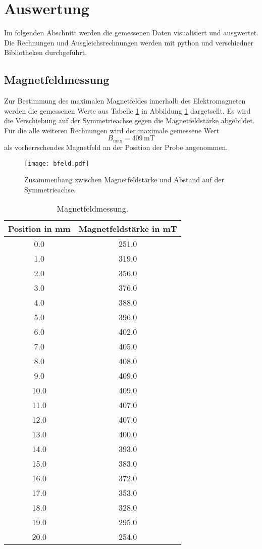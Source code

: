 \section{Auswertung}
\label{sec:Auswertung}

Im folgenden Abschnitt werden die gemessenen Daten visualisiert und ausgwertet.
Die Rechnungen und Ausgleichsrechnungen werden mit python und verschiedner Bibliotheken durchgeführt.

\subsection{Magnetfeldmessung}
\label{sec:magFeld}

Zur Bestimmung des maximalen Magnetfeldes innerhalb des Elektromagneten werden die gemessenen Werte aus Tabelle \ref{tab:magFeld} in Abbildung \ref{abb:magFeld} dargetsellt.
Es wird die Verschiebung auf der Symmetrieachse gegen die Magnetfeldstärke abgebildet.
Für die alle weiteren Rechnungen wird der maximale gemessene Wert
\begin{equation}
  B_{\text{max}}=409\,\text{mT}
\end{equation}
als vorherrschendes Magnetfeld an der Position der Probe angenommen.
\begin{figure}
  \centering
  \texttt{[image: bfeld.pdf]}
  \caption{Zusammenhang zwischen Magnetfeldstärke und Abstand auf der Symmetrieachse.}
  \label{abb:magFeld}
\end{figure}
\FloatBarrier

\begin{table}
  \centering
  \caption{Magnetfeldmessung.}
  \label{tab:magFeld}
  \begin{tabular}{c | c}
    \toprule
    Position in mm & Magnetfeldstärke in mT \\
    \midrule
    0.0 & 251.0 \\
    1.0 & 319.0 \\
    2.0 & 356.0 \\
    3.0 & 376.0 \\
    4.0 & 388.0 \\
    5.0 & 396.0 \\
    6.0 & 402.0 \\
    7.0 & 405.0 \\
    8.0 & 408.0 \\
    9.0 & 409.0 \\
    10.0 & 409.0 \\
    11.0 & 407.0 \\
    12.0 & 407.0 \\
    13.0 & 400.0 \\
    14.0 & 393.0 \\
    15.0 & 383.0 \\
    16.0 & 372.0 \\
    17.0 & 353.0 \\
    18.0 & 328.0 \\
    19.0 & 295.0 \\
    20.0 & 254.0 \\
    \bottomrule
  \end{tabular}
\end{table}
\FloatBarrier


